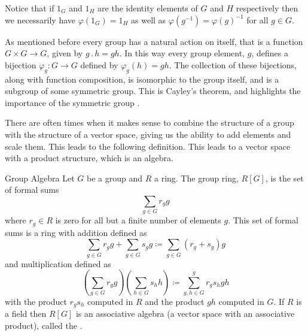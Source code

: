 \documentclass[fleqn]{NotesClass}
\newcommand{\identity}{1}
\newcommand{\action}{\mathbin{.}}
\begin{document}
    Notice that if \(\identity_G\) and \(\identity_H\) are the identity elements of \(G\) and \(H\) respectively then we necessarily have \(\varphi(\identity_G) = \identity_H\) as well as \(\varphi(g^{-1}) = \varphi(g)^{-1}\) for all \(g \in G\).
    
    As mentioned before every group has a natural action on itself, that is a function \(G \times G \to G\), given by \(g \action h = gh\).
    In this way every group element, \(g\), defines a bijection \(\varphi_g \colon G \to G\) defined by \(\varphi_g(h) = gh\).
    The collection of these bijections, along with function composition, is isomorphic to the group itself, and is a subgroup of some symmetric group.
    This is Cayley's theorem, and highlights the importance of the symmetric group \cite[120]{dummit}.
    
    There are often times when it makes sense to combine the structure of a group with the structure of a vector space, giving us the ability to add elements and scale them.
    This leads to the following definition.
    This leads to a vector space with a product structure, which is an algebra.
    
    \begin{dfn}{Group Algebra}{}
        Let \(G\) be a group and \(R\) a ring.
        The group ring, \(R[G]\), is the set of formal sums
        \begin{equation}
            \sum_{g \in G} r_g g
        \end{equation}
        where \(r_g \in R\) is zero for all but a finite number of elements \(g\).
        This set of formal sums is a ring with addition defined as
        \begin{equation}
            \sum_{g \in G} r_g g + \sum_{g \in G} s_g g \coloneqq \sum_{g\in G}(r_g + s_g) g
        \end{equation}
        and multiplication defined as
        \begin{equation}
            \left( \sum_{g \in G} r_g g \right) \left( \sum_{h \in G} s_h h \right) \coloneqq \sum_{g, h \in G}^{g} r_g s_h gh
        \end{equation}
        with the product \(r_gs_h\) computed in \(R\) and the product \(gh\) computed in \(G\).
        If \(R\) is a field then \(R[G]\) is an associative algebra (a vector space with an associative product), called the  \cite[740]{hassani}.
    \end{dfn}
    
\end{document}
